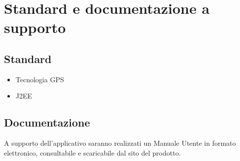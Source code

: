\documentclass[a4paper,12pt]{article}
\begin{document}
\pagebreak

\section{Standard e documentazione a supporto}
\subsection{Standard}
\begin{itemize}
\item Tecnologia GPS
\item J2EE
\end{itemize}

\subsection{Documentazione}

A supporto dell'applicativo saranno realizzati un Manuale Utente in formato elettronico, consultabile e scaricabile dal sito del prodotto.
\pagebreak
\end{document}
